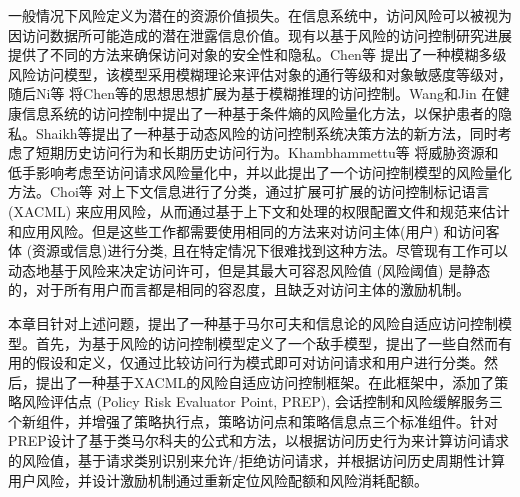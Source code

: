 一般情况下风险定义为潜在的资源价值损失。在信息系统中，访问风险可以被视为因访问数据所可能造成的潜在泄露信息价值。现有以基于风险的访问控制研究进展提供了不同的方法来确保访问对象的安全性和隐私。Chen等\cite{cheng2007fuzzy} 提出了一种模糊多级风险访问模型，该模型采用模糊理论来评估对象的通行等级和对象敏感度等级对，随后Ni等\cite{ni2010risk} 将Chen等的思想思想扩展为基于模糊推理的访问控制。Wang和Jin\cite{wang2011quantified} 在健康信息系统的访问控制中提出了一种基于条件熵的风险量化方法，以保护患者的隐私。Shaikh等\cite{shaikh2012dynamic}提出了一种基于动态风险的访问控制系统决策方法的新方法，同时考虑了短期历史访问行为和长期历史访问行为。Khambhammettu等\cite{khambhammettu2013framework} 将威胁资源和低手影响考虑至访问请求风险量化中，并以此提出了一个访问控制模型的风险量化方法。Choi等\cite{choi2015framework} 对上下文信息进行了分类，通过扩展可扩展的访问控制标记语言 (XACML) 来应用风险，从而通过基于上下文和处理的权限配置文件和规范来估计和应用风险。但是这些工作都需要使用相同的方法来对访问主体(用户) 和访问客体 (资源或信息)进行分类, 且在特定情况下很难找到这种方法。尽管现有工作可以动态地基于风险来决定访问许可，但是其最大可容忍风险值 (风险阈值) 是静态的，对于所有用户而言都是相同的容忍度，且缺乏对访问主体的激励机制。

本章目针对上述问题，提出了一种基于马尔可夫和信息论的风险自适应访问控制模型。首先，为基于风险的访问控制模型定义了一个敌手模型，提出了一些自然而有用的假设和定义，仅通过比较访问行为模式即可对访问请求和用户进行分类。然后，提出了一种基于XACML的风险自适应访问控制框架。在此框架中，添加了策略风险评估点 (Policy Risk Evaluator Point, PREP), 会话控制和风险缓解服务三个新组件，并增强了策略执行点，策略访问点和策略信息点三个标准组件。针对PREP设计了基于类马尔科夫的公式和方法，以根据访问历史行为来计算访问请求的风险值，基于请求类别识别来允许/拒绝访问请求，并根据访问历史周期性计算用户风险，并设计激励机制通过重新定位风险配额和风险消耗配额。

